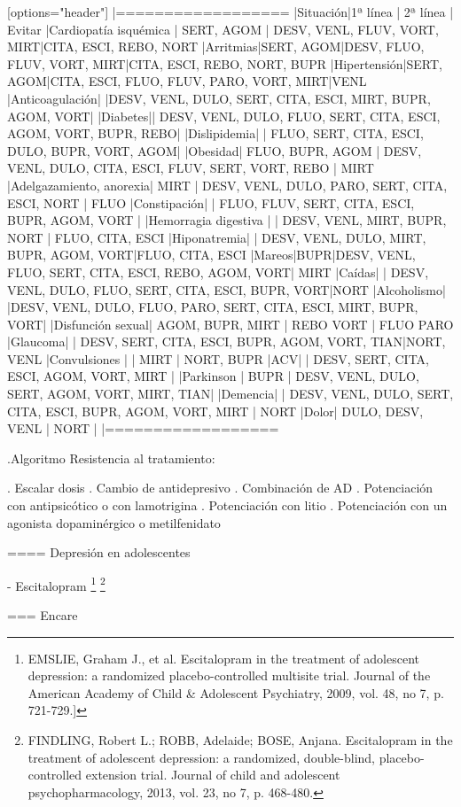 \documentclass[encares.tex]{subfiles}
\begin{document}
[options="header"]
|==================
|Situación|1ª línea | 2ª línea | Evitar
|Cardiopatía isquémica | SERT, AGOM | DESV, VENL, FLUV, VORT, MIRT|CITA, ESCI, REBO, NORT
|Arritmias|SERT, AGOM|DESV, FLUO, FLUV, VORT, MIRT|CITA, ESCI, REBO, NORT, BUPR
|Hipertensión|SERT, AGOM|CITA, ESCI, FLUO, FLUV, PARO, VORT, MIRT|VENL
|Anticoagulación| |DESV, VENL, DULO, SERT, CITA, ESCI, MIRT, BUPR, AGOM, VORT|
|Diabetes|| DESV, VENL, DULO, FLUO, SERT, CITA, ESCI, AGOM, VORT, BUPR, REBO|
|Dislipidemia| | FLUO, SERT, CITA, ESCI, DULO, BUPR, VORT, AGOM|
|Obesidad| FLUO, BUPR, AGOM | DESV, VENL, DULO, CITA, ESCI, FLUV, SERT, VORT, REBO | MIRT
|Adelgazamiento, anorexia| MIRT | DESV, VENL, DULO, PARO, SERT, CITA, ESCI, NORT | FLUO
|Constipación| | FLUO, FLUV, SERT, CITA, ESCI, BUPR, AGOM, VORT |
|Hemorragia digestiva | | DESV, VENL, MIRT, BUPR, NORT | FLUO, CITA, ESCI
|Hiponatremia| | DESV, VENL, DULO, MIRT, BUPR, AGOM, VORT|FLUO, CITA, ESCI
|Mareos|BUPR|DESV, VENL, FLUO, SERT, CITA, ESCI, REBO, AGOM, VORT| MIRT
|Caídas| | DESV, VENL, DULO, FLUO, SERT, CITA, ESCI, BUPR, VORT|NORT
|Alcoholismo| |DESV, VENL, DULO, FLUO, PARO, SERT, CITA, ESCI, MIRT, BUPR, VORT|
|Disfunción sexual| AGOM, BUPR, MIRT | REBO VORT | FLUO PARO
|Glaucoma| | DESV, SERT, CITA, ESCI, BUPR, AGOM, VORT, TIAN|NORT, VENL
|Convulsiones | | MIRT | NORT, BUPR
|ACV| | DESV, SERT, CITA, ESCI, AGOM, VORT, MIRT |
|Parkinson | BUPR | DESV, VENL, DULO, SERT, AGOM, VORT, MIRT, TIAN|
|Demencia| | DESV, VENL, DULO, SERT, CITA, ESCI, BUPR, AGOM, VORT, MIRT | NORT
|Dolor| DULO, DESV, VENL | NORT |
|==================

.Algoritmo
Resistencia al tratamiento:

. Escalar dosis
. Cambio de antidepresivo
. Combinación de AD
. Potenciación con antipsicótico o con lamotrigina
. Potenciación con litio
. Potenciación con un agonista dopaminérgico o metilfenidato

==== Depresión en adolescentes

- Escitalopram \footnote{EMSLIE, Graham J., et al. Escitalopram in the treatment of adolescent depression: a randomized placebo-controlled multisite trial. Journal of the American Academy of Child \& Adolescent Psychiatry, 2009, vol. 48, no 7, p. 721-729.]} \footnote{FINDLING, Robert L.; ROBB, Adelaide; BOSE, Anjana. Escitalopram in the treatment of adolescent depression: a randomized, double-blind, placebo-controlled extension trial. Journal of child and adolescent psychopharmacology, 2013, vol. 23, no 7, p. 468-480.}

=== Encare
\end{document}
